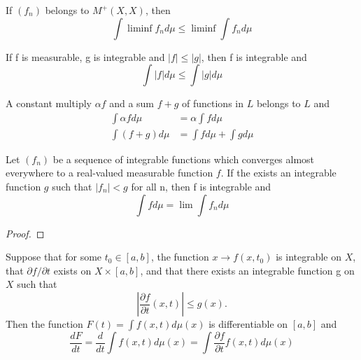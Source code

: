 \begin{lemma}
    If $(f_n)$ belongs to $M^{+}(X,X)$, then
    $$
        \int \liminf f_n d\mu \leq \liminf \int f_n d\mu
    $$
\end{lemma}
\begin{corollary}
    If f is measurable, g is integrable and $|f| \leq |g|$, then f is integrable
    and
    $$
        \int |f| d\mu \leq  \int |g| d\mu
    $$
\end{corollary}
\begin{theorem}
    A constant multiply $\alpha f$ and a sum $f + g$ of functions in $L$ belongs
    to $L$ and
    \begin{align*}
         \int \alpha fd\mu &= \alpha \int f d\mu \\
         \int (f + g)d\mu  &= \int fd\mu + \int gd\mu
    \end{align*}
\end{theorem}
\begin{theorem}
    Let $(f_n)$ be a sequence of integrable functions which converges almost
    everywhere to a real-valued measurable function $f$. If the exists an 
    integrable function $g$ such that $|f_n| < g$ for all n, then f is integrable
    and
    $$
    \int f d\mu = \lim \int f_n d\mu
    $$
\end{theorem}
\begin{proof}

\end{proof}
\begin{corollary}
    Suppose that for some $t_0 \in [a,b]$,  the function $x \rightarrow %
    f(x, t_0)$ is integrable on $X$, that $\partial f / \partial t$ exists on 
    $X \times [a,b]$, and that there exists an integrable function g on $X$ such 
    that
    $$
        \left|\dfrac{\partial f}{\partial t} (x,t) \right| \leq g(x).
    $$
    Then the function $F(t) = \displaystyle \int f(x,t)d\mu(x)$ is differentiable 
    on $[a,b]$ and
    $$
         \dfrac{dF}{dt} = \dfrac{d }{dt} 
         \int f(x,t)d\mu(x)  = \int \dfrac{\partial f}{\partial t} f(x,t)d\mu(x)
    $$
\end{corollary}
